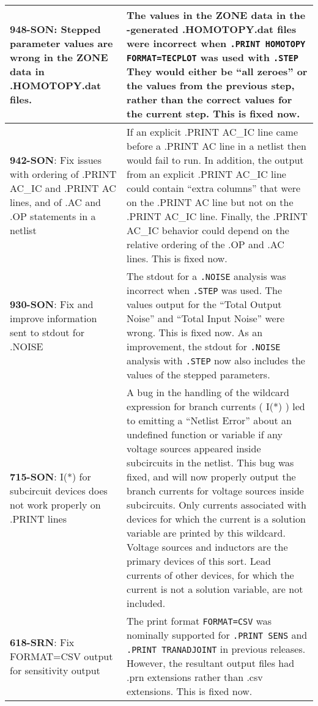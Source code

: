 {\begin{longtable}[h] {>{\raggedright\small}m{2in}|>{\raggedright\let\\\tabularnewline\small}m{3.5in}}
     \textbf{948-SON}: Stepped parameter values are wrong in the ZONE data in .HOMOTOPY.dat files. & 
     The values in the ZONE data in the \Xyce{}-generated .HOMOTOPY.dat files were incorrect when 
     \texttt{.PRINT HOMOTOPY FORMAT=TECPLOT} was used with \texttt{.STEP}  They would either be 
     ``all zeroes'' or the values from the previous step, rather than the correct values for the 
     current step.  This is fixed now.  \\ \hline

     \textbf{942-SON}: Fix issues with ordering of .PRINT AC\_IC and .PRINT AC 
     lines, and of .AC and .OP statements in a netlist &  If an explicit .PRINT AC\_IC line 
     came before a .PRINT AC line in a netlist then \Xyce{} would fail to run.  In addition, 
     the output from an explicit .PRINT AC\_IC line could contain ``extra columns'' that 
     were on the .PRINT AC line but not on the .PRINT AC\_IC line.  Finally, the 
     .PRINT AC\_IC behavior could depend on the relative ordering of the .OP and 
     .AC lines.  This is fixed now.  \\ \hline

     \textbf{930-SON}: Fix and improve information sent to stdout for .NOISE & 
     The stdout for a \texttt{.NOISE} analysis was incorrect when \texttt{.STEP} was used.
     The values output for the ``Total Output Noise'' and ``Total Input Noise'' were wrong.  
     This is fixed now.  As an improvement, the stdout for \texttt{.NOISE} analysis with 
     \texttt{.STEP} now also includes the values of the stepped parameters.  
     \\ \hline

     \textbf{715-SON}: I(*) for subcircuit devices does not work
     properly on .PRINT lines & A bug in the handling of the wildcard
     expression for branch currents ( I(*) ) led to \Xyce{} emitting a
     ``Netlist Error'' about an undefined function or variable if any
     voltage sources appeared inside subcircuits in the netlist.  This
     bug was fixed, and \Xyce{} will now properly output the branch
     currents for voltage sources inside subcircuits.  Only currents
     associated with devices for which the current is a solution
     variable are printed by this wildcard.  Voltage sources and
     inductors are the primary devices of this sort.  Lead currents of
     other devices, for which the current is not a solution variable,
     are not included. \\ \hline

     \textbf{618-SRN}: Fix FORMAT=CSV output for sensitivity output & The print format
     \texttt{FORMAT=CSV} was nominally supported for \texttt{.PRINT SENS} and \texttt{.PRINT
     TRANADJOINT} in previous \Xyce{} releases.  However, the resultant output files
     had .prn extensions rather than .csv extensions.  This is fixed now.
     \\ \hline


\end{longtable}}
